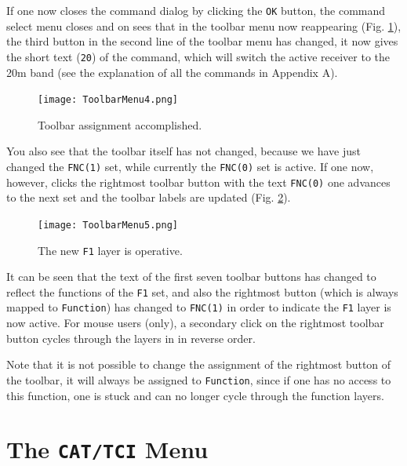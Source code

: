 \documentclass[12pt]{book}
\def\bltt#1{\texttt{\color{blue}#1}}
\begin{document}
If one now closes the command dialog by clicking the \texttt{OK} button, the command select menu
closes and on sees that in the toolbar menu now reappearing (Fig. \ref{fig:ToolbarMenu4}), the third button
in the second
line of the toolbar menu has changed, it now gives the short text (\texttt{20}) of the command, which will
switch the active receiver to the 20m band (see the explanation of all the commands in Appendix A).

\begin{figure}[ht!]
\center
\texttt{[image: ToolbarMenu4.png]}
\caption{Toolbar assignment accomplished.}
\label{fig:ToolbarMenu4}
\end{figure}

You also see that the toolbar itself has not changed, because we have just changed the \texttt{FNC(1)} set,
while currently the \texttt{FNC(0)} set is active. If one now, however, clicks the rightmost
toolbar button with the text \texttt{FNC(0)} one advances to the next set and the toolbar labels
are updated (Fig. \ref{fig:ToolbarMenu5}).

\begin{figure}[ht!]
\center
\texttt{[image: ToolbarMenu5.png]}
\caption{The new \texttt{F1} layer is operative.}
\label{fig:ToolbarMenu5}
\end{figure}

It can be seen that the text of the first seven toolbar buttons has changed to reflect
the functions of the \texttt{F1} set, and also the rightmost button (which is always mapped
to \bltt{Function}) has changed to \texttt{FNC(1)} in order to indicate the \texttt{F1}
layer is now active. For mouse users (only), a secondary click on the rightmost toolbar
button cycles through the layers in in reverse order.

Note that it is not possible to change the assignment of the  rightmost button of the toolbar,
it will always be assigned to \bltt{Function}, since if one has no access to this
function, one is stuck and can no longer cycle through the function layers.

\section{The \texttt{CAT/TCI} Menu}
\end{document}
